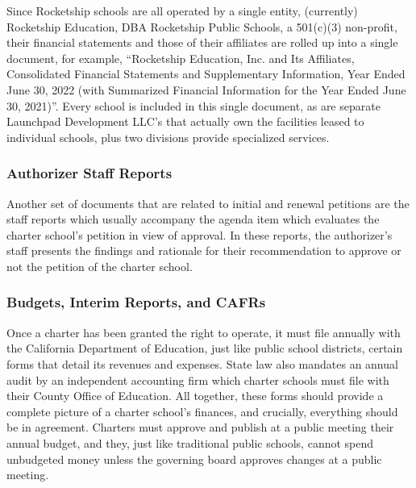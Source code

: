 Since Rocketship schools are all operated by a single entity, (currently) Rocketship Education, DBA Rocketship Public Schools, a 501(c)(3) non-profit, their financial statements and those of their affiliates are rolled up into a single document, for example, ``Rocketship Education, Inc. and Its Affiliates, Consolidated Financial Statements and Supplementary Information, Year Ended June 30, 2022
(with Summarized Financial Information for the Year Ended June 30, 2021)''.  Every school is included in this single document, as are separate Launchpad Development LLC's that actually own the facilities leased to individual schools, plus two divisions provide specialized services. %

\subsubsection{Authorizer Staff Reports}\label{sec:cs-staff-reports}\indent%

Another set of documents that are related to initial and renewal petitions are the staff reports which usually accompany the agenda item which evaluates the charter school's petition in view of approval. In these reports, the authorizer's staff presents the findings and rationale for their recommendation to approve or not the petition of the charter school.

\subsubsection{Budgets,  Interim Reports, and CAFRs}\label{sec:budgets-etc}\indent%

Once a charter has been granted the right to operate, it must file annually with the California Department of Education, just like public school districts, certain forms that detail its revenues and expenses. State law also mandates an annual audit by an independent accounting firm which charter schools must file with their County Office of Education. All together, these forms should provide a complete picture of a charter school's finances, and crucially, everything should be in agreement. Charters must approve and publish at a public meeting their annual budget, and they, just like traditional public schools, cannot spend unbudgeted money unless the governing board approves changes at a public meeting.

